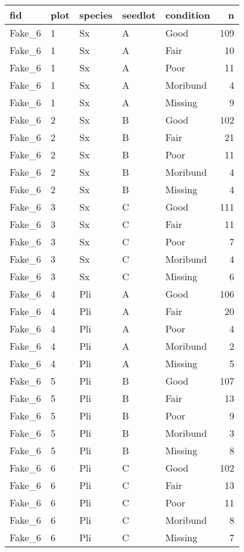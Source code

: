 \documentclass[
]{article}
\begin{document}
\begin{tabular}{l|l|l|l|l|r}
\hline
fid & plot & species & seedlot & condition & n\\
\hline
Fake\_6 & 1 & Sx & A & Good & 109\\
\hline
Fake\_6 & 1 & Sx & A & Fair & 10\\
\hline
Fake\_6 & 1 & Sx & A & Poor & 11\\
\hline
Fake\_6 & 1 & Sx & A & Moribund & 4\\
\hline
Fake\_6 & 1 & Sx & A & Missing & 9\\
\hline
Fake\_6 & 2 & Sx & B & Good & 102\\
\hline
Fake\_6 & 2 & Sx & B & Fair & 21\\
\hline
Fake\_6 & 2 & Sx & B & Poor & 11\\
\hline
Fake\_6 & 2 & Sx & B & Moribund & 4\\
\hline
Fake\_6 & 2 & Sx & B & Missing & 4\\
\hline
Fake\_6 & 3 & Sx & C & Good & 111\\
\hline
Fake\_6 & 3 & Sx & C & Fair & 11\\
\hline
Fake\_6 & 3 & Sx & C & Poor & 7\\
\hline
Fake\_6 & 3 & Sx & C & Moribund & 4\\
\hline
Fake\_6 & 3 & Sx & C & Missing & 6\\
\hline
Fake\_6 & 4 & Pli & A & Good & 106\\
\hline
Fake\_6 & 4 & Pli & A & Fair & 20\\
\hline
Fake\_6 & 4 & Pli & A & Poor & 4\\
\hline
Fake\_6 & 4 & Pli & A & Moribund & 2\\
\hline
Fake\_6 & 4 & Pli & A & Missing & 5\\
\hline
Fake\_6 & 5 & Pli & B & Good & 107\\
\hline
Fake\_6 & 5 & Pli & B & Fair & 13\\
\hline
Fake\_6 & 5 & Pli & B & Poor & 9\\
\hline
Fake\_6 & 5 & Pli & B & Moribund & 3\\
\hline
Fake\_6 & 5 & Pli & B & Missing & 8\\
\hline
Fake\_6 & 6 & Pli & C & Good & 102\\
\hline
Fake\_6 & 6 & Pli & C & Fair & 13\\
\hline
Fake\_6 & 6 & Pli & C & Poor & 11\\
\hline
Fake\_6 & 6 & Pli & C & Moribund & 8\\
\hline
Fake\_6 & 6 & Pli & C & Missing & 7\\

\end{tabular}
\end{document}
